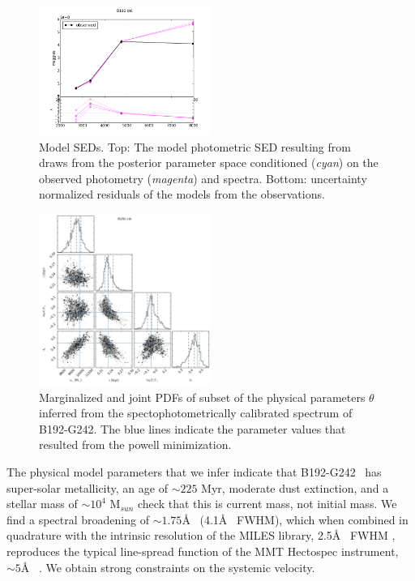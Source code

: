 \documentclass[iop,numberedappendix]{emulateapj}
\newcommand{\excluster}{B192-G242}
\begin{document}
\begin{figure}[h!]
\includegraphics[width=0.5\textwidth]{figures/pfig_b192-g242_225_cal.png}
\caption{ Model SEDs.  Top: The model photometric SED resulting from
draws from the posterior parameter space conditioned ({\it cyan}) on
the observed photometry ({\it magenta}) and spectra.  Bottom:
uncertainty normalized residuals of the models from the observations.
\label{fig:inferred_sed}}
\end{figure}

\begin{figure}[h!]
\includegraphics[width=0.5\textwidth]{figures/ptri_b192-g242_225_cal.png}
\caption{ Marginalized and joint PDFs of subset of the physical
parameters $\theta$ inferred from the spectophotometrically calibrated
spectrum of \excluster. The blue lines indicate the parameter values
that resulted from the powell minimization.
\label{fig:inferred_params}}
\end{figure}

The physical model parameters that we infer indicate that \excluster~
has super-solar metallicity, an age of $\sim 225$ Myr, moderate dust
extinction, and a stellar mass of $\sim 10^{4}$ M$_{sun}$ {\color{blue}
check that this is current mass, not initial mass}.  We find a spectral
broadening of $\sim 1.75$\AA~ (4.1\AA~ FWHM), which when combined in
quadrature with the intrinsic resolution of the MILES library, 2.5\AA~
FWHM \citep{beifiori11}, reproduces the typical line-spread function
of the MMT Hectospec instrument, $\sim 5$\AA~ \citep{fabricant13}.
We obtain strong constraints on the systemic velocity.
\end{document}

